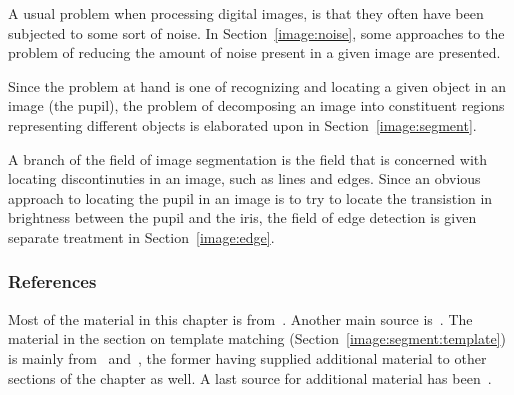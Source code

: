 A usual problem when processing digital images, is that they often
have been subjected to some sort of noise.  In
Section~\ref{image:noise}, some approaches to the problem of reducing
the amount of noise present in a given image are presented.  

Since the problem at hand is one of recognizing and locating a given
object in an image (the pupil), the problem of decomposing an image
into constituent regions representing different objects is elaborated
upon in Section~\ref{image:segment}.  

A branch of the field of image segmentation is the field that is
concerned with locating discontinuties in an image, such as lines and
edges.  Since an obvious approach to locating the pupil in an image is
to try to locate the transistion in brightness between the pupil and
the iris, the field of edge detection is given separate treatment in
Section~\ref{image:edge}.

\subsubsection{References}

Most of the material in this chapter is from~\cite{digim}.  Another
main source is~\cite{digpic}.  The material in the section on template
matching (Section~\ref{image:segment:template}) is mainly
from~\cite{digpat} and~\cite{template}, the former having supplied
additional material to other sections of the chapter as well.  A last
source for additional material has been~\cite{digbild}.
